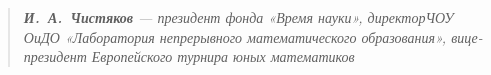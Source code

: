 \begin{quote}
\itshape {\bfseries И.~А.~Чистяков} — президент фонда «Время науки», директор\linebreak ЧОУ ОиДО «Лаборатория непрерывного математического образования», вице-президент Европейского турнира юных математиков
\end{quote}